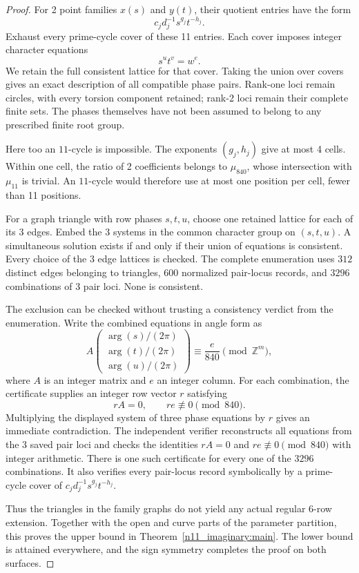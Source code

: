 \documentclass[11pt,a4paper]{article}
\theoremstyle{plain}
\theoremstyle{definition}
\theoremstyle{plain}
\begin{document}
\begin{proof}
\medskip
For 2 point families $x(s)$ and $y(t)$, their quotient entries have the form
\[
c_jd_j^{-1}s^{g_j}t^{-h_j}.
\]
Exhaust every prime-cycle cover of these 11 entries. Each cover imposes integer character equations
\[
s^u t^v=w^{e}.
\]
We retain the full consistent lattice for that cover. Taking the union over covers gives an exact description of all compatible phase pairs. Rank-one loci remain circles, with every torsion component retained; rank-2 loci remain their complete finite sets. The phases themselves have not been assumed to belong to any prescribed finite root group.

Here too an $11$-cycle is impossible. The exponents $(g_j,h_j)$ give at most 4 cells. Within one cell, the ratio of 2 coefficients belongs to $\mu_{840}$, whose intersection with $\mu_{11}$ is trivial. An $11$-cycle would therefore use at most one position per cell, fewer than 11 positions.

For a graph triangle with row phases $s,t,u$, choose one retained lattice for each of its 3 edges. Embed the 3 systems in the common character group on $(s,t,u)$. A simultaneous solution exists if and only if their union of equations is consistent. Every choice of the 3 edge lattices is checked. The complete enumeration uses $312$ distinct edges belonging to triangles, $600$ normalized pair-locus records, and $3296$ combinations of 3 pair loci. None is consistent.

The exclusion can be checked without trusting a consistency verdict from the enumeration. Write the combined equations in angle form as
\[
A\begin{pmatrix}\arg(s)/(2\pi)\\\arg(t)/(2\pi)\\\arg(u)/(2\pi)\end{pmatrix}
\equiv\frac{e}{840}\pmod{\mathbb Z^m},
\]
where $A$ is an integer matrix and $e$ an integer column. For each combination, the certificate supplies an integer row vector $r$ satisfying
\[
rA=0,\qquad re\not\equiv0\pmod{840}.
\]
Multiplying the displayed system of three phase equations by $r$ gives an immediate contradiction. The independent verifier reconstructs all equations from the 3 saved pair loci and checks the identities $rA=0$ and $re\not\equiv0\pmod{840}$ with integer arithmetic. There is one such certificate for every one of the $3296$ combinations. It also verifies every pair-locus record symbolically by a prime-cycle cover of $c_jd_j^{-1}s^{g_j}t^{-h_j}$.

Thus the triangles in the family graphs do not yield any actual regular 6-row extension. Together with the open and curve parts of the parameter partition, this proves the upper bound in Theorem~\ref{n11_imaginary:main}. The lower bound is attained everywhere, and the sign symmetry completes the proof on both surfaces.
\end{proof}
\end{document}
